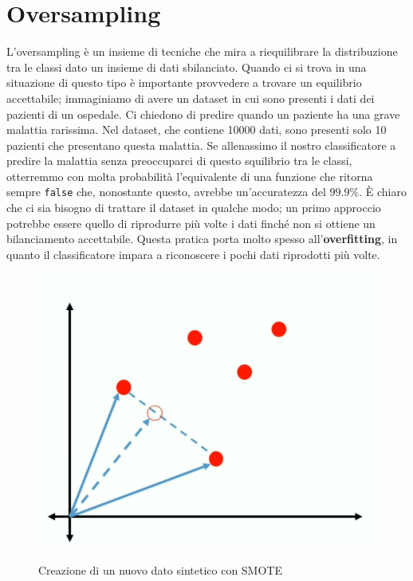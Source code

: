 \documentclass[12pt, twoside, letterpaper]{report}
\begin{document}
	
		\section{Oversampling}
			L'oversampling è un insieme di tecniche che mira a riequilibrare la distribuzione tra le classi dato un insieme di dati sbilanciato. Quando ci si trova in una situazione di questo tipo è importante provvedere a trovare un equilibrio accettabile; immaginiamo di avere un dataset in cui sono presenti i dati dei pazienti di un ospedale. Ci chiedono di predire quando un paziente ha una grave malattia rarissima. Nel dataset, che contiene 10000 dati, sono presenti solo 10 pazienti che presentano questa malattia. Se allenassimo il nostro classificatore a predire la malattia senza preoccuparci di questo squilibrio tra le classi, otterremmo con molta probabilità l'equivalente di una funzione che ritorna sempre \texttt{false} che, nonostante questo, avrebbe un'accuratezza del $99.9\%$. È chiaro che ci sia bisogno di trattare il dataset in qualche modo; un primo approccio potrebbe essere quello di riprodurre più volte i dati  finché non si ottiene un bilanciamento accettabile. Questa pratica porta molto spesso all'\textbf{overfitting}, in quanto il classificatore impara a riconoscere i pochi dati riprodotti più volte.
						
			\begin{figure}
				\centering
				\includegraphics[scale=0.25]{smote.png}\\
				\caption{Creazione di un nuovo dato sintetico con SMOTE}
				\label{fig:smote_fig}
			\end{figure}
			
\end{document}

